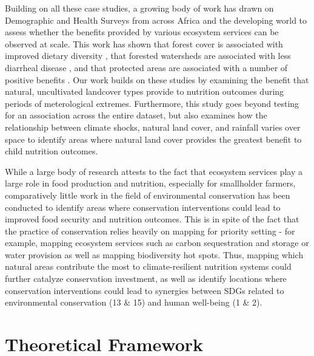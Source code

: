 \documentclass{article}
\begin{document}
Building on all these case studies, a growing body of work has drawn on Demographic and Health Surveys from across Africa and the developing world to assess whether the benefits provided by various ecosystem services can be observed at scale.  This work has shown that forest cover is associated with improved dietary diversity \cite{Ickowitz2014, Rasolofoson2018}, that forested watersheds are associated with less diarrheal disease \cite{Herrera2017}, and that protected areas are associated with a number of positive benefits \cite{naidoo2019evaluating}.  Our work builds on these studies by examining the benefit that natural, uncultivated landcover types provide to nutrition outcomes during periods of meterological extremes.  Furthermore, this study goes beyond testing for an association across the entire dataset, but also examines how the relationship between climate shocks, natural land cover, and rainfall varies over space to identify areas where natural land cover provides the greatest benefit to child nutrition outcomes.

While a large body of research attests to the fact that ecosystem services play a large role in food production and nutrition, especially for smallholder farmers, comparatively little work in the field of environmental conservation has been conducted to identify areas where conservation interventions could lead to improved food security and nutrition outcomes.  This is in spite of the fact that the practice of conservation relies heavily on mapping for priority setting - for example, mapping ecosystem services such as carbon sequestration and storage or water provision as well as mapping biodiversity hot spots.  Thus, mapping which natural areas contribute the most to climate-resilient nutrition systems could further catalyze conservation investment, as well as identify locations where conservation interventions could lead to synergies between SDGs related to environmental conservation (13 \& 15) and human well-being (1 \& 2).

\section{Theoretical Framework}
\end{document}
